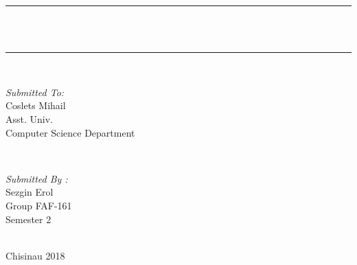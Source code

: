 \documentclass[12pt]{article}
\makeatletter
\let\thetitle\@title
\makeatother
\begin{document}
\begin{titlepage}
                \rule{\linewidth}{0.2 mm} \\[0.4 cm]

                { \huge \bfseries \thetitle}\\
                \rule{\linewidth}{0.2 mm} \\[1.5 cm]
                
                \begin{minipage}{0.4\textwidth}
                        \begin{flushleft} \large
                                \emph{Submitted To:}\\
                                Coslets Mihail\\
                Asst. Univ.\\
                Computer Science Department\\
                            \end{flushleft}
                            \end{minipage}~
                            \begin{minipage}{0.4\textwidth}
                
                            \begin{flushright} \large
                            \emph{Submitted By :} \\
                            Sezgin Erol\\
                
                Group FAF-161\\
                Semester 2\\
                    \end{flushright}
                
                \end{minipage}\\[2 cm]
                
                \vfill Chisinau 2018\\  
        \end{titlepage}
        
\end{document}

